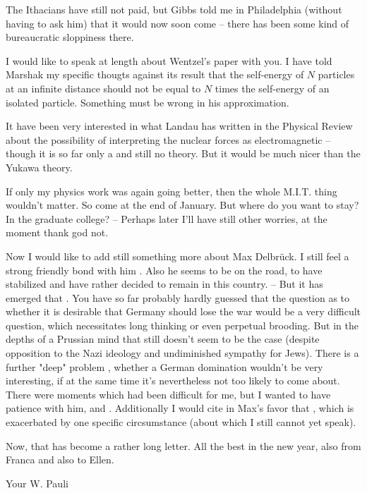 The Ithacians have still not paid, but Gibbs told me in Philadelphia (without having to ask him) that it would now soon come -- there has been some kind of bureaucratic sloppiness there.

I would like to speak at length about Wentzel's paper with you. I have told Marshak my specific thougts against its result that the self-energy of $N$ particles at an infinite distance should not be equal to $N$ times the self-energy of an isolated particle. Something must be wrong in his approximation.

It have been very interested in what Landau has written in the Physical Review about the possibility of interpreting the nuclear forces as electromagnetic -- though it is so far only a  and still no theory. But it would be much nicer than the  Yukawa theory.

If only my physics work was again going better, then the whole M.I.T. thing wouldn't matter. So come at the end of January. But where do you want to stay? In the graduate college? -- Perhaps later I'll have still other worries, at the moment thank god not.

Now I would like to add still something more about Max Delbr\"uck. I still feel a strong friendly bond with him . Also he seems to be on the road, to have stabilized and have rather decided to remain in this country. -- But it has emerged that . You have so far probably hardly guessed that the question as to whether it is desirable that Germany should lose the war would be a very difficult question, which necessitates long thinking or even perpetual brooding. But in the depths of a Prussian mind that still doesn't seem to be the case (despite opposition to the Nazi ideology and undiminished sympathy for Jews). There is a further "deep" problem , whether a German domination wouldn't be very interesting, if at the same time it's nevertheless not too likely to come about. There were moments which had been difficult for me, but I wanted to have patience with him, and . Additionally I would cite in Max's favor that , which is exacerbated by one specific circsumstance (about which I still cannot yet speak).

Now, that has become a rather long letter. All the best in the new year, also from Franca and also to Ellen.

Your W. Pauli


